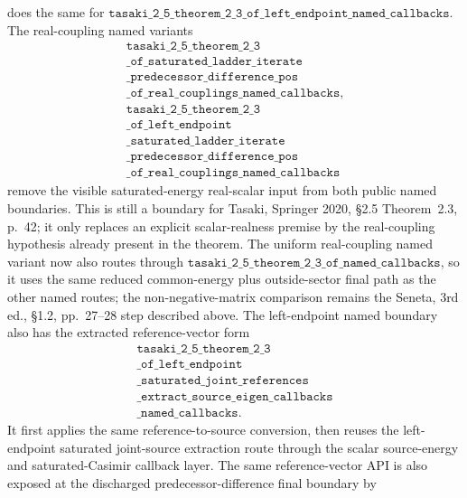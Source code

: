 \documentclass[a4paper,11pt]{article}
\begin{document}
does the same for
\(\texttt{tasaki\_2\_5\_theorem\_2\_3\_of\_left\_endpoint\_named\_callbacks}\).
The real-coupling named variants
\[
\begin{gathered}
\texttt{tasaki\_2\_5\_theorem\_2\_3}\\
\texttt{\_of\_saturated\_ladder\_iterate}\\
\texttt{\_predecessor\_difference\_pos}\\
\texttt{\_of\_real\_couplings\_named\_callbacks},\\
\texttt{tasaki\_2\_5\_theorem\_2\_3}\\
\texttt{\_of\_left\_endpoint}\\
\texttt{\_saturated\_ladder\_iterate}\\
\texttt{\_predecessor\_difference\_pos}\\
\texttt{\_of\_real\_couplings\_named\_callbacks}
\end{gathered}
\]
remove the visible saturated-energy real-scalar input from both public named
boundaries.  This is still a boundary for Tasaki, Springer 2020, §2.5
Theorem~2.3, p.~42; it only replaces an explicit scalar-realness premise by
the real-coupling hypothesis already present in the theorem.  The uniform
real-coupling named variant now also routes through
\(\texttt{tasaki\_2\_5\_theorem\_2\_3\_of\_named\_callbacks}\), so it uses
the same reduced common-energy plus outside-sector final path as the other
named routes; the non-negative-matrix comparison remains the Seneta,
3rd ed., §1.2, pp.~27--28 step described above.
The left-endpoint named boundary also has the extracted reference-vector
form
\[
\begin{gathered}
\texttt{tasaki\_2\_5\_theorem\_2\_3}\\
\texttt{\_of\_left\_endpoint}\\
\texttt{\_saturated\_joint\_references}\\
\texttt{\_extract\_source\_eigen\_callbacks}\\
\texttt{\_named\_callbacks}.
\end{gathered}
\]
It first applies the same reference-to-source conversion, then reuses the
left-endpoint saturated joint-source extraction route through the scalar
source-energy and saturated-Casimir callback layer.
The same reference-vector API is also exposed at the discharged
predecessor-difference final boundary by
\end{document}
